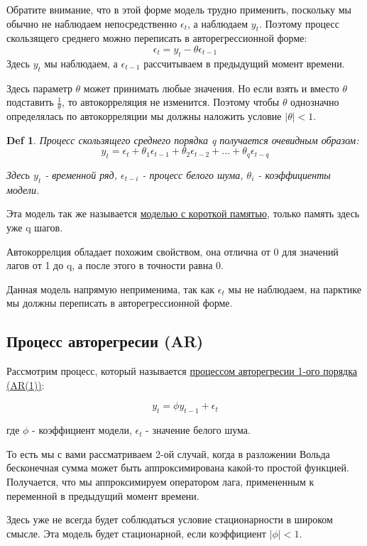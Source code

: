 \documentclass{article}
\newtheorem*{definition}{Def}
\begin{document}
Обратите внимание, что в этой форме модель трудно применить, поскольку мы обычно не наблюдаем непосредственно $\epsilon_t$, а наблюдаем $y_t$. Поэтому процесс скользящего среднего можно переписать в авторегрессионной форме: $$ \epsilon_t = y_t - \theta \epsilon_{t-1}$$
Здесь $y_t$ мы наблюдаем, а $\epsilon_{t-1}$ рассчитываем в предыдущий момент времени. 

Здесь параметр $\theta$ может принимать любые значения. Но если взять и вместо $\theta$ подставить $\frac{1}{\theta}$, то автокорреляция не изменится. Поэтому чтобы $\theta$ однозначно определялась по автокорреляции мы должны наложить условие $| \theta | < 1$. 

\begin{definition}
Процесс скользящего среднего порядка q получается очевидным образом:
$$y_t = \epsilon_t + \theta_1\epsilon_{t-1} + \theta_2\epsilon_{t-2} + \dots + \theta_q\epsilon_{t-q}$$

Здесь $y_t$ - временной ряд, $\epsilon_{t-i}$ - процесс белого шума, $\theta_i$ - коэффициенты модели. 
\end{definition}
 

Эта модель так же называется \underline{моделью с короткой памятью}, только память здесь уже q шагов. 

Автокоррелция обладает похожим свойством, она отлична от 0 для значений лагов от 1 до q, а после этого в точности равна 0. 

Данная модель напрямую неприменима, так как $\epsilon_{t} $ мы не наблюдаем, на парктике мы должны переписать в авторегрессионной форме. 

\subsection{Процесс авторегресии (AR)}

Рассмотрим процесс, который называется \underline{процессом авторегресии 1-ого порядка (AR(1))}:

$$y_t = \phi y_{t-1} + \epsilon_{t} $$

где $\phi$ - коэффициент модели, $\epsilon_{t}$ - значение белого шума. 

То есть мы с вами рассматриваем 2-ой случай, когда в разложении Вольда бесконечная сумма может быть аппроксимирована какой-то простой функцией. Получается, что мы аппроксимируем оператором лага, примененным к переменной в предыдущий момент времени.

Здесь уже не всегда будет соблюдаться условие стационарности в широком смысле. Эта модель будет стационарной, если коэффициент $|\phi| < 1$.
\end{document}
